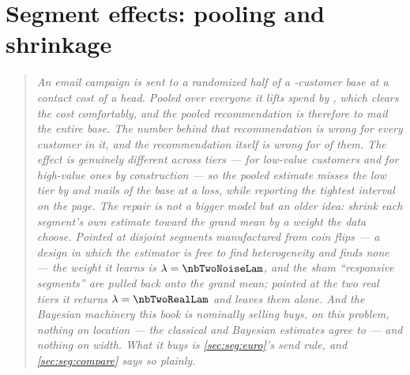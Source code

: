 %
\chapter{Segment effects: pooling and shrinkage}
\label{ch:seg}

\begin{quote}\small
\emph{An email campaign is sent to a randomized half of a \nbTwoN-customer base at a contact
cost of \eur{\nbTwoCost} a head. Pooled over everyone it lifts spend by \eur{\nbTwoCpEst}, which
clears the cost comfortably, and the pooled recommendation is therefore to mail the entire base.
The number behind that recommendation is wrong for every customer in it, and the recommendation
itself is wrong for \pc{\nbTwoShareLow} of them. The effect is genuinely different across
tiers --- \eur{\nbTwoTrueLow} for low-value customers and \eur{\nbTwoTrueHigh} for high-value ones
by construction --- so the pooled estimate misses the low tier by \eur{\nbTwoCpMissLow} and mails
\pc{\nbTwoShareLow} of the base at a loss, while reporting the tightest interval on the page. The
repair is not a bigger model but an older idea: shrink each segment's own estimate toward the grand
mean by a weight the data choose. Pointed at \nbTwoNNoise{} disjoint segments manufactured from coin
flips --- a design in which the estimator is free to find heterogeneity and finds none --- the
weight it learns is $\lambda = \nbTwoNoiseLam$, and the sham ``responsive segments'' are pulled back
onto the grand mean; pointed at the two real tiers it returns $\lambda = \nbTwoRealLam$ and leaves
them alone. And the Bayesian machinery this book is nominally selling buys, on this problem,
\emph{nothing} on location --- the classical and Bayesian estimates agree to \eur{\nbTwoMaxPairGap}
--- and nothing on width. What it buys is \cref{sec:seg:euro}'s send rule, and
\cref{sec:seg:compare} says so plainly.}
\end{quote}

